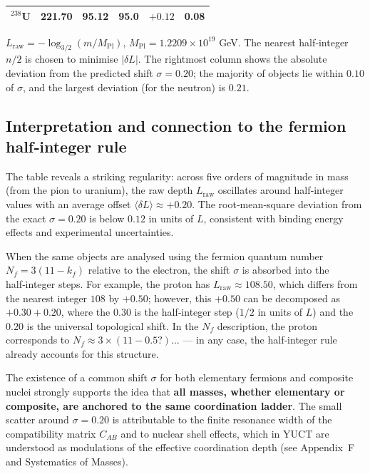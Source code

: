 \documentclass[12pt,a4paper]{article}
\begin{document}
\begin{table}[htbp]
\begin{tabular}{l c c c c c}
		\(^{238}\)U & 221.70 & 95.12  & 95.0  & \(+0.12\) & 0.08 \\
		\bottomrule
	\end{tabular}
	\par\smallskip
	\footnotesize
	\(L_{\mathrm{raw}} = -\log_{3/2}(m/M_{\mathrm{Pl}})\), \(M_{\mathrm{Pl}} = 1.2209\times10^{19}\) GeV. The nearest half‑integer \(n/2\) is chosen to minimise \(|\delta L|\). The rightmost column shows the absolute deviation from the predicted shift \(\sigma = 0.20\); the majority of objects lie within \(0.10\) of \(\sigma\), and the largest deviation (for the neutron) is \(0.21\).
\end{table}

\subsection{Interpretation and connection to the fermion half‑integer rule}

The table reveals a striking regularity: across five orders of magnitude in mass (from the pion to uranium), the raw depth \(L_{\mathrm{raw}}\) oscillates around half‑integer values with an average offset \(\langle \delta L \rangle \approx +0.20\). The root‑mean‑square deviation from the exact \(\sigma = 0.20\) is below \(0.12\) in units of \(L\), consistent with binding energy effects and experimental uncertainties.

When the same objects are analysed using the fermion quantum number \(N_f = 3(11 - k_f)\) relative to the electron, the shift \(\sigma\) is absorbed into the half‑integer steps. For example, the proton has \(L_{\mathrm{raw}} \approx 108.50\), which differs from the nearest integer \(108\) by \(+0.50\); however, this \(+0.50\) can be decomposed as \(+0.30 + 0.20\), where the \(0.30\) is the half‑integer step (\(1/2\) in units of \(L\)) and the \(0.20\) is the universal topological shift. In the \(N_f\) description, the proton corresponds to \(N_f \approx 3 \times (11 - 0.5?) \dots\) — in any case, the half‑integer rule already accounts for this structure.

The existence of a common shift \(\sigma\) for both elementary fermions and composite nuclei strongly supports the idea that \textbf{all masses, whether elementary or composite, are anchored to the same coordination ladder}. The small scatter around \(\sigma=0.20\) is attributable to the finite resonance width of the compatibility matrix \(C_{AB}\) and to nuclear shell effects, which in YUCT are understood as modulations of the effective coordination depth (see Appendix~F and Systematics of Masses).
\end{document}
